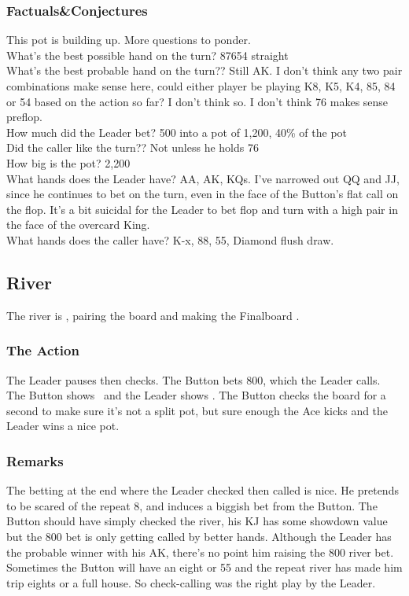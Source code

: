 \subsubsection*{Factuals\&Conjectures}

This pot is building up. More questions to ponder. \\
What's the best possible hand on the turn? 87654 straight \\
What's the best probable hand on the turn?? Still AK. I don't think any
two pair combinations make sense here, could either player be playing
K8, K5, K4, 85, 84 or 54 based on the action so far? I don't think so. I
don't think 76 makes sense preflop. \\
How much did the Leader bet? 500 into a pot of 1,200, 40\% of the pot \\
Did the caller like the turn?? Not unless he holds 76 \\
How big is the pot? 2,200 \\
What hands does the Leader have? AA, AK, KQs. I've narrowed out QQ and JJ,
since he continues to bet on the turn, even in the face of the Button's flat
call on the flop. It's a bit suicidal for the Leader to bet flop and
turn with a high pair in the face of the overcard King.\\
What hands does the caller have? K-x, 88, 55, Diamond flush draw.

\subsection*{River}
The river is \eigs, pairing the board and making
the Finalboard \Kc\eigd\fived\fours\eigs.

\subsubsection*{The Action}
The Leader pauses then checks. The Button bets 800, which the Leader calls.
The Button shows \Kd\Jc\ and the Leader shows \As\Ks. The Button
checks the board for a second to make sure it's not a split pot, but
sure enough the Ace kicks and the Leader wins a nice pot.

\subsubsection*{Remarks}
The betting at the end where the Leader checked then called is nice. He
pretends to be scared of the repeat 8, and induces a biggish bet from the
Button. The Button should have simply checked the river, his KJ has some
showdown value but the 800 bet is only getting called by better hands.
Although the Leader has the probable winner with his AK, there's no point
him raising the 800 river bet. Sometimes the Button will have an eight
or 55 and the repeat river has made him trip eights or a full house.
So check-calling was the right play by the Leader.

